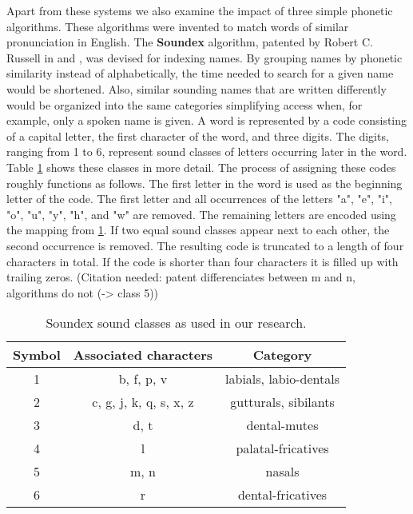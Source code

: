 Apart from these systems we also examine the impact of three simple phonetic algorithms.
These algorithms were invented to match words of similar pronunciation in English.
The \textbf{Soundex} algorithm, patented by Robert C. Russell in \cite{russel1918soundex} and \cite{russel1922soundex}, was devised for indexing names.
By grouping names by phonetic similarity instead of alphabetically, the time needed to search for a given name would be shortened.
Also, similar sounding names that are written differently would be organized into the same categories simplifying access when, for example, only a spoken name is given.
A word is represented by a code consisting of a capital letter, the first character of the word, and three digits.
The digits, ranging from 1 to 6, represent sound classes of letters occurring later in the word.
Table \ref{tab:soundex_sound_classes} shows these classes in more detail.
The process of assigning these codes roughly functions as follows.
The first letter in the word is used as the beginning letter of the code.
The first letter and all occurrences of the letters "a", "e", "i", "o", "u", "y", "h", and "w" are removed.
The remaining letters are encoded using the mapping from \ref{tab:soundex_sound_classes}.
If two equal sound classes appear next to each other, the second occurrence is removed.
The resulting code is truncated to a length of four characters in total.
If the code is shorter than four characters it is filled up with trailing zeros.
(Citation needed: patent differenciates between m and n, algorithms do not (-> class 5))\\

\begin{table}
\caption{Soundex sound classes as used in our research.}
\label{tab:soundex_sound_classes}
\centering\small
\begin{tabular}{@{}c@{\hspace{3\tabcolsep}}cc@{}} %
\toprule
\bf Symbol & \bf Associated characters & \bf Category \\
\midrule
1 & b, f, p, v             & labials, labio-dentals \\
2 & c, g, j, k, q, s, x, z & gutturals, sibilants \\
3 & d, t                   & dental-mutes \\
4 & l                      & palatal-fricatives \\
5 & m, n                   & nasals \\
6 & r                      & dental-fricatives \\
\bottomrule
\end{tabular}
\end{table}

